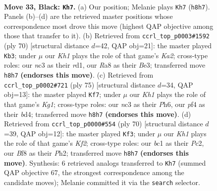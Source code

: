 \documentclass[11pt]{article}
\begin{document}
\clearpage

\begin{figure}[p]\centering
\begin{subfigure}{0.46\textwidth}\centering
\resizebox{\linewidth}{!}{%
\newchessgame
\chessboard[
  setfen={r4b1k/p7/P1N3p1/1P4P1/5P2/2N5/8/R1B1K3 b Q - 0 33},
  showmover=false,
  pgfstyle=straightmove, color=movearrow, markmove={h8-h7}
]}
\caption{}
\end{subfigure}\hfill
\begin{subfigure}{0.46\textwidth}\centering
\resizebox{\linewidth}{!}{%
\newchessgame
\chessboard[
  setfen={3b4/3B1pk1/R2P2p1/4p3/8/3nBP2/KP6/3r4 w - - 2 36},
  showmover=false,
  pgfstyle=straightmove, color=movearrow, markmove={a2-b3}
]}
\caption{}
\end{subfigure}
\\[4pt]
\begin{subfigure}{0.46\textwidth}\centering
\resizebox{\linewidth}{!}{%
\newchessgame
\chessboard[
  setfen={6k1/8/6pp/6p1/p2B4/P4P1P/3R2PK/2r2b2 b - - 1 38},
  showmover=false,
  pgfstyle=straightmove, color=movearrow, markmove={g8-f7}
]}
\caption{}
\end{subfigure}\hfill
\begin{subfigure}{0.46\textwidth}\centering
\resizebox{\linewidth}{!}{%
\newchessgame
\chessboard[
  setfen={3r2k1/7p/3n1pp1/R7/2p2P2/B1P5/2P2K1P/8 w - - 0 36},
  showmover=false,
  pgfstyle=straightmove, color=movearrow, markmove={f2-f3}
]}
\caption{}
\end{subfigure}
\caption{\textbf{Move 33, Black: \texttt{Kh7}.} (a) Our position; Melanie plays \texttt{Kh7} (\texttt{h8h7}). Panels (b)--(d) are the retrieved master positions whose correspondence most drove this move (highest QAP objective among those that transfer to it). (b) Retrieved from \texttt{ccrl\_top\_p0003\#1592} (ply 70) [structural distance $d$=42, QAP obj=21]: the master played \texttt{Kb3}; under $\mu$ our \emph{Kh1} plays the role of that game's \emph{Ka2}; cross-type roles: our \emph{n}c3 as their \emph{r}d1, our \emph{R}a8 as their \emph{B}e3; transferred move \texttt{h8h7} \textbf{(endorses this move)}. (c) Retrieved from \texttt{ccrl\_top\_p0002\#721} (ply 75) [structural distance $d$=34, QAP obj=13]: the master played \texttt{Kf7}; under $\mu$ our \emph{Kh1} plays the role of that game's \emph{Kg1}; cross-type roles: our \emph{n}c3 as their \emph{P}h6, our \emph{p}f4 as their \emph{b}d4; transferred move \texttt{h8h7} \textbf{(endorses this move)}. (d) Retrieved from \texttt{ccrl\_top\_p0000\#554} (ply 70) [structural distance $d$=39, QAP obj=12]: the master played \texttt{Kf3}; under $\mu$ our \emph{Kh1} plays the role of that game's \emph{Kf2}; cross-type roles: our \emph{b}c1 as their \emph{P}c2, our \emph{B}f8 as their \emph{P}h2; transferred move \texttt{h8h7} \textbf{(endorses this move)}. Synthesis: 6 retrieved analogs transferred to \texttt{Kh7} (summed QAP objective 67, the strongest correspondence among the candidate moves); Melanie committed it via the \texttt{search} selector.}
\label{fig:thought-m65}
\end{figure}
\end{document}
